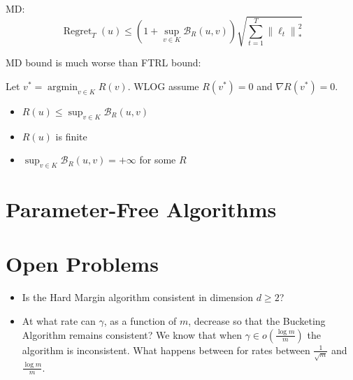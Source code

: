 \documentclass[largefonts,landscape]{sciposter}
\DeclareMathOperator{\Regret}{Regret}
\DeclareMathOperator*{\argmin}{argmin}
\newcommand{\norm}[1]{\left\|#1\right\|}
\newcommand{\grad}{\nabla}
\newcommand{\Breg}{\mathcal{B}}
\begin{document}
\begin{multicols}{3}
\begin{minipage}{1.0\linewidth}
MD:
$$
\Regret_T(u) \le \left(1 + \sup_{v \in K} \Breg_{R}(u,v) \right) \sqrt{\sum_{t=1}^T \norm{\ell_t}_*^2}
$$
\end{minipage}

\begin{minipage}{1.0\linewidth}
MD bound is much worse than FTRL bound:

Let $v^* = \argmin_{v \in K} R(v)$.
WLOG assume $R(v^*) = 0$ and $\grad R(v^*) = 0$.

\begin{itemize}
\item $R(u) \le \sup_{v \in K} \Breg_{R}(u,v)$
\item $R(u)$ is finite
\item $\sup_{v \in K} \Breg_{R}(u,v) = + \infty$ for some $R$
\end{itemize}
\end{minipage}


\columnbreak

\section*{Parameter-Free Algorithms}



\section*{Open Problems}

\begin{itemize}
\item Is the Hard Margin algorithm consistent in dimension $d \ge 2$?

\item At what rate can $\gamma$, as a function of $m$, decrease so that the Bucketing Algorithm remains consistent?
We know that when $\gamma \in o(\frac{\log m}{m})$ the algorithm is inconsistent. What happens between for rates between $\frac{1}{\sqrt{m}}$
and $\frac{\log m}{m}$.
\end{itemize}

\end{multicols}
\end{document}
